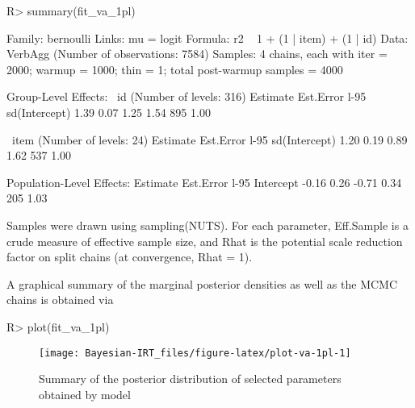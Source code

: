 \documentclass[jss]{jss}
\begin{document}
\begin{CodeChunk}

\begin{CodeInput}
R> summary(fit_va_1pl)
\end{CodeInput}

\begin{CodeOutput}
 Family: bernoulli 
  Links: mu = logit 
Formula: r2 ~ 1 + (1 | item) + (1 | id) 
   Data: VerbAgg (Number of observations: 7584) 
Samples: 4 chains, each with iter = 2000; warmup = 1000; thin = 1;
         total post-warmup samples = 4000

Group-Level Effects: 
~id (Number of levels: 316) 
              Estimate Est.Error l-95%
sd(Intercept)     1.39      0.07     1.25     1.54        895 1.00

~item (Number of levels: 24) 
              Estimate Est.Error l-95%
sd(Intercept)     1.20      0.19     0.89     1.62        537 1.00

Population-Level Effects: 
          Estimate Est.Error l-95%
Intercept    -0.16      0.26    -0.71     0.34        205 1.03

Samples were drawn using sampling(NUTS). For each parameter, Eff.Sample 
is a crude measure of effective sample size, and Rhat is the potential 
scale reduction factor on split chains (at convergence, Rhat = 1).
\end{CodeOutput}
\end{CodeChunk}

A graphical summary of the marginal posterior densities as well as the
MCMC chains is obtained via

\begin{CodeChunk}

\begin{CodeInput}
R> plot(fit_va_1pl)
\end{CodeInput}
\begin{figure}

{\centering \texttt{[image: Bayesian-IRT\_files/figure-latex/plot-va-1pl-1]} 

}

\caption{Summary of the posterior distribution of selected parameters obtained by model }\label{fig:plot-va-1pl}
\end{figure}
\end{CodeChunk}
\end{document}
